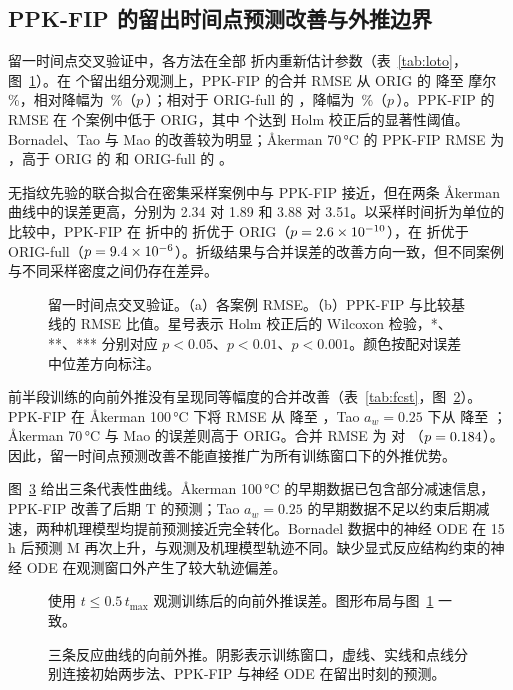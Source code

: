\subsection{PPK-FIP 的留出时间点预测改善与外推边界}
留一时间点交叉验证中，各方法在全部 \NLotoFolds{} 折内重新估计参数（表~\ref{tab:loto}，图~\ref{fig:loto}）。在 \NFitPoints{} 个留出组分观测上，PPK-FIP 的合并 RMSE 从 ORIG 的 \LotoAllOrig{} 降至 \LotoAllNew{} 摩尔\,\%，相对降幅为 \LotoAllRedOrig\,\%（$p$\,\LotoAllPOrig）；相对于 ORIG-full 的 \LotoAllFull，降幅为 \LotoAllRedFull\,\%（$p$\,\LotoAllPFull）。PPK-FIP 的 RMSE 在 \LotoWinsOrig{} 个案例中低于 ORIG，其中 \LotoSigWinsOrig{} 个达到 Holm 校正后的显著性阈值。Bornadel、Tao 与 Mao 的改善较为明显；Åkerman 70\,°C 的 PPK-FIP RMSE 为 \LotoAkSeventyNew，高于 ORIG 的 \LotoAkSeventyOrig{} 和 ORIG-full 的 \LotoAkSeventyFull。

无指纹先验的联合拟合在密集采样案例中与 PPK-FIP 接近，但在两条 Åkerman 曲线中的误差更高，分别为 2.34 对 1.89 和 3.88 对 3.51。以采样时间折为单位的比较中，PPK-FIP 在 \FoldN{} 折中的 \FoldWinsOrig{} 折优于 ORIG（$p=2.6\times10^{-10}$），在 \FoldWinsFull{} 折优于 ORIG-full（$p=9.4\times10^{-6}$）。折级结果与合并误差的改善方向一致，但不同案例与不同采样密度之间仍存在差异。
\begin{figure}[!htbp]\centering{}\caption{留一时间点交叉验证。（a）各案例 RMSE。（b）PPK-FIP 与比较基线的 RMSE 比值。星号表示 Holm 校正后的 Wilcoxon 检验，*、**、*** 分别对应 $p<0.05$、$p<0.01$、$p<0.001$。颜色按配对误差中位差方向标注。}\label{fig:loto}\end{figure}

前半段训练的向前外推没有呈现同等幅度的合并改善（表~\ref{tab:fcst}，图~\ref{fig:fcstbars}）。PPK-FIP 在 Åkerman 100\,°C 下将 RMSE 从 \FcstAkHundredOrig{} 降至 \FcstAkHundredNew，Tao $a_w=0.25$ 下从 \FcstTaoAOrig{} 降至 \FcstTaoANew；Åkerman 70\,°C 与 Mao 的误差则高于 ORIG。合并 RMSE 为 \FcstAllNew{} 对 \FcstAllOrig{}（$p=0.184$）。因此，留一时间点预测改善不能直接推广为所有训练窗口下的外推优势。

图~\ref{fig:fcst} 给出三条代表性曲线。Åkerman 100\,°C 的早期数据已包含部分减速信息，PPK-FIP 改善了后期 T 的预测；Tao $a_w=0.25$ 的早期数据不足以约束后期减速，两种机理模型均提前预测接近完全转化。Bornadel 数据中的神经 ODE 在 15\,h 后预测 M 再次上升，与观测及机理模型轨迹不同。缺少显式反应结构约束的神经 ODE 在观测窗口外产生了较大轨迹偏差。
\begin{figure}[!htbp]\centering{}\caption{使用 $t\le0.5\,t_\mathrm{max}$ 观测训练后的向前外推误差。图形布局与图~\ref{fig:loto} 一致。}\label{fig:fcstbars}\end{figure}
\begin{figure}[!htbp]\centering{}\caption{三条反应曲线的向前外推。阴影表示训练窗口，虚线、实线和点线分别连接初始两步法、PPK-FIP 与神经 ODE 在留出时刻的预测。}\label{fig:fcst}\end{figure}

